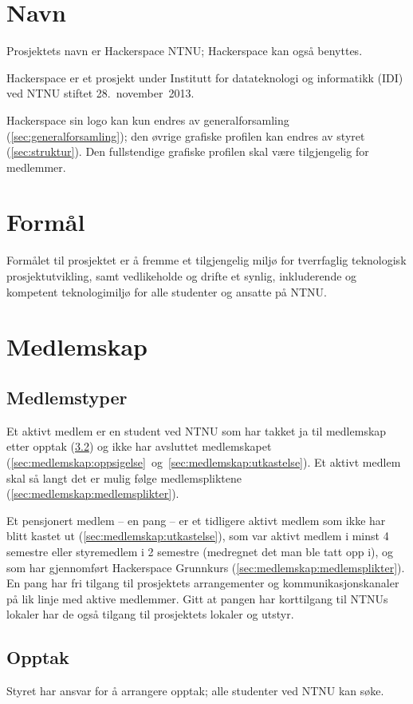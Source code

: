 \setcounter{secnumdepth}{3}
\section{Navn}\label{sec:navn}
Prosjektets navn er Hackerspace NTNU; Hackerspace kan også benyttes.

Hackerspace er et prosjekt under Institutt for datateknologi og informatikk (IDI) ved NTNU stiftet 28.~november~2013.

Hackerspace sin logo kan kun endres av generalforsamling (\ref{sec:generalforsamling}); den øvrige grafiske profilen kan endres av styret (\ref{sec:struktur}). Den fullstendige grafiske profilen skal være tilgjengelig for medlemmer.


\section{Formål}\label{sec:formål}
Formålet til prosjektet er å fremme et tilgjengelig miljø for tverrfaglig teknologisk prosjektutvikling, samt vedlikeholde og drifte et synlig, inkluderende og kompetent teknologimiljø for alle studenter og ansatte på NTNU.\@


\section{Medlemskap}\label{sec:medlemskap}
\subsection{Medlemstyper}\label{sec:medlemskap:medlemstyper}
Et aktivt medlem er en student ved NTNU som har takket ja til medlemskap etter opptak (\ref{sec:medlemskap:opptak}) og ikke har avsluttet medlemskapet (\ref{sec:medlemskap:oppsigelse}~og~\ref{sec:medlemskap:utkastelse}).
Et aktivt medlem skal så langt det er mulig følge medlemspliktene (\ref{sec:medlemskap:medlemsplikter}).

Et pensjonert medlem -- en pang -- er et tidligere aktivt medlem som ikke har blitt kastet ut (\ref{sec:medlemskap:utkastelse}), som var aktivt medlem i minst 4 semestre eller styremedlem i 2 semestre (medregnet det man ble tatt opp i), og som har gjennomført Hackerspace Grunnkurs (\ref{sec:medlemskap:medlemsplikter}).
En pang har fri tilgang til prosjektets arrangementer og kommunikasjonskanaler på lik linje med aktive medlemmer. 
Gitt at pangen har korttilgang til NTNUs lokaler har de også tilgang til prosjektets lokaler og utstyr.

\subsection{Opptak}\label{sec:medlemskap:opptak}
Styret har ansvar for å arrangere opptak; alle studenter ved NTNU kan søke.

